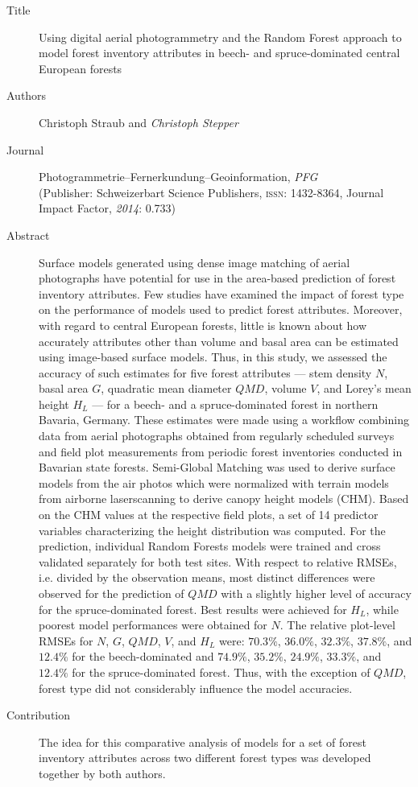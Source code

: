 \begin{description}
	\item[Title] Using digital aerial photogrammetry and the Random Forest approach to model forest inventory attributes
		in beech- and spruce-dominated central European forests
	\item[Authors] Christoph Straub and \emph{Christoph Stepper}
	\item[Journal] Photogrammetrie--Fernerkundung--Geoinformation, \emph{PFG} \\ (Publisher: Schweizerbart Science Publishers, \textsc{issn}: 1432-8364, 
		Journal Impact Factor, \emph{2014}: 0.733)
	\item[Abstract] Surface models generated using dense image matching of aerial photographs have 
		potential for use in the area-based prediction of forest inventory attributes. Few studies have
		examined the impact of forest type on the performance of models used to predict forest attributes.
		Moreover, with regard to central European forests, little is known about how accurately attributes
		other than volume and basal area can be estimated using image-based surface models. Thus, in this
		study, we assessed the accuracy of such estimates for five forest attributes --- stem density $N$, basal
		area $G$, quadratic mean diameter $QMD$, volume $V$, and Lorey’s mean height $H_L$ --- for a beech- and a
		spruce-dominated forest in northern Bavaria, Germany. These estimates were made using a workflow
		combining data from aerial photographs obtained from regularly scheduled surveys and field plot
		measurements from periodic forest inventories conducted in Bavarian state forests. Semi-Global
		Matching was used to derive surface models from the air photos which were normalized with terrain
		models from airborne laserscanning to derive canopy height models (CHM). Based on the CHM
		values at the respective field plots, a set of 14 predictor variables characterizing the height distribution
		was computed. For the prediction, individual Random Forests models were trained and cross
		validated separately for both test sites. With respect to relative RMSEs, i.e. divided by the observation
		means, most distinct differences were observed for the prediction of $QMD$ with a slightly higher level
		of accuracy for the spruce-dominated forest. Best results were achieved for $H_L$, while poorest model
		performances were obtained for $N$. The relative plot-level RMSEs for $N$, $G$, $QMD$, $V$, and $H_L$ were:
		$70.3\%$, $36.0\%$, $32.3\%$, $37.8\%$, and $12.4\%$ for the beech-dominated and $74.9\%$, $35.2\%$, $24.9\%$, $33.3\%$,
		and $12.4\%$ for the spruce-dominated forest. Thus, with the exception of $QMD$, forest type did not
		considerably influence the model accuracies.
	\item[Contribution] The idea for this comparative analysis of models for a set of forest inventory attributes 
		across two different forest types was developed together by both authors. 
	

\end{description}
